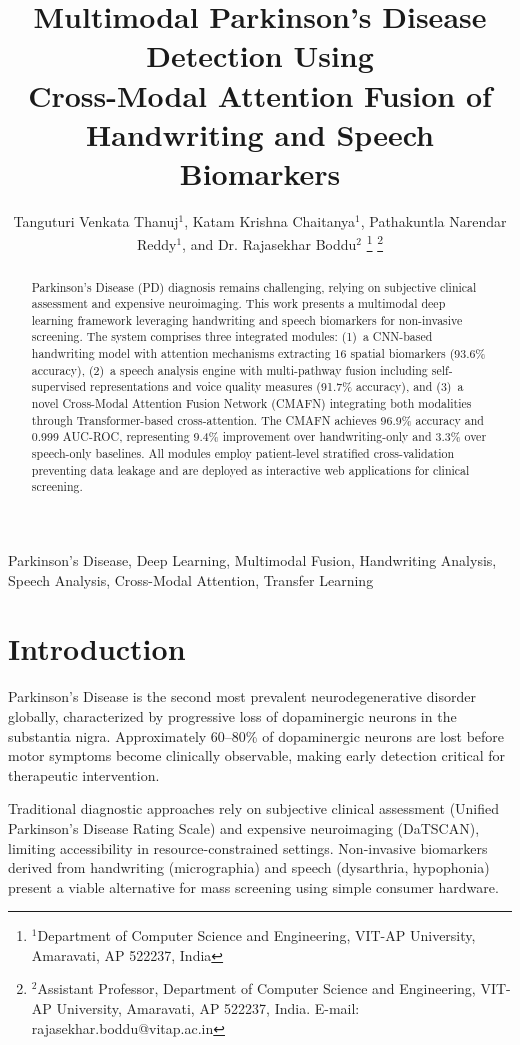 \documentclass[10pt,conference,letterpaper]{IEEEtran}
\title{Multimodal Parkinson's Disease Detection Using\\
Cross-Modal Attention Fusion of Handwriting and Speech Biomarkers}
\author{
    Tanguturi Venkata Thanuj$^{1}$, Katam Krishna Chaitanya$^{1}$, Pathakuntla Narendar Reddy$^{1}$, and Dr. Rajasekhar Boddu$^{2}$
    \thanks{$^{1}$Department of Computer Science and Engineering, VIT-AP University, Amaravati, AP 522237, India}
    \thanks{$^{2}$Assistant Professor, Department of Computer Science and Engineering, VIT-AP University, Amaravati, AP 522237, India. E-mail: rajasekhar.boddu@vitap.ac.in}
}
\begin{document}
\maketitle

\begin{abstract}
Parkinson's Disease (PD) diagnosis remains challenging, relying on subjective clinical assessment and expensive neuroimaging. This work presents a multimodal deep learning framework leveraging handwriting and speech biomarkers for non-invasive screening. The system comprises three integrated modules: (1)~a CNN-based handwriting model with attention mechanisms extracting 16 spatial biomarkers (93.6\% accuracy), (2)~a speech analysis engine with multi-pathway fusion including self-supervised representations and voice quality measures (91.7\% accuracy), and (3)~a novel Cross-Modal Attention Fusion Network (CMAFN) integrating both modalities through Transformer-based cross-attention. The CMAFN achieves 96.9\% accuracy and 0.999 AUC-ROC, representing 9.4\% improvement over handwriting-only and 3.3\% over speech-only baselines. All modules employ patient-level stratified cross-validation preventing data leakage and are deployed as interactive web applications for clinical screening.
\end{abstract}

\begin{IEEEkeywords}
Parkinson's Disease, Deep Learning, Multimodal Fusion, Handwriting Analysis, Speech Analysis, Cross-Modal Attention, Transfer Learning
\end{IEEEkeywords}

\section{Introduction}

Parkinson's Disease is the second most prevalent neurodegenerative disorder globally, characterized by progressive loss of dopaminergic neurons in the substantia nigra. Approximately 60--80\% of dopaminergic neurons are lost before motor symptoms become clinically observable, making early detection critical for therapeutic intervention.

Traditional diagnostic approaches rely on subjective clinical assessment (Unified Parkinson's Disease Rating Scale) and expensive neuroimaging (DaTSCAN), limiting accessibility in resource-constrained settings. Non-invasive biomarkers derived from handwriting (micrographia) and speech (dysarthria, hypophonia) present a viable alternative for mass screening using simple consumer hardware.
\end{document}
